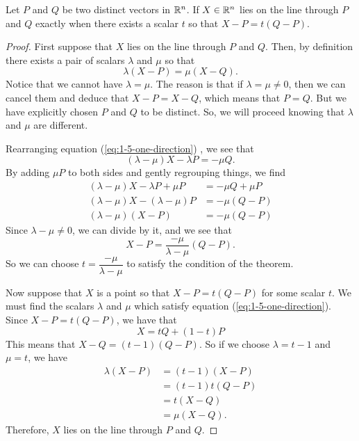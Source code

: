 \documentclass[elementsmain.tex]{subfiles}
\begin{document}
\begin{theorem} \label{thm:one-direction}
Let $P$ and $Q$ be two distinct vectors in $\mathbb{R}^n$.
If $X\in\mathbb{R}^n$ lies on the line through $P$ and $Q$ exactly when there exists a scalar $t$ so that $X-P = t(Q-P)$.
\end{theorem}

\begin{proof}
First suppose that $X$ lies on the line through $P$ and $Q$. Then, by definition there exists a pair of scalars $\lambda$ and $\mu$ so that 
\begin{equation}\label{eq:1-5-one-direction}
\lambda(X-P) = \mu(X-Q).
\end{equation}
Notice that we cannot have $\lambda=\mu$. The reason is that if $\lambda = \mu \neq 0$, then we can cancel them and deduce that $X-P = X-Q$, which means that $P=Q$. But we have explicitly chosen $P$ and $Q$ to be distinct. So, we will proceed knowing that $\lambda$ and $\mu$ are different.

Rearranging equation (\ref{eq:1-5-one-direction}) , we see that
\[
(\lambda-\mu)X - \lambda P = -\mu Q.
\]
By adding $\mu P$ to both sides and gently regrouping things, we find
\begin{align*}
(\lambda - \mu) X -\lambda P + \mu P &= - \mu Q + \mu P \\
(\lambda - \mu) X - (\lambda -\mu)P &= -\mu (Q - P) \\
(\lambda - \mu) (X - P) &= -\mu (Q - P)
\end{align*}
Since $\lambda - \mu \neq 0$, we can divide by it, and we see that
\[
X - P = \dfrac{-\mu}{\lambda-\mu} (Q-P).
\]
So we can choose $t = \dfrac{-\mu}{\lambda-\mu}$ to satisfy the condition of the theorem.

Now suppose that $X$ is a point so that $X-P = t (Q-P)$ for some scalar $t$.
We must find the scalars $\lambda$ and $\mu$ which satisfy equation (\ref{eq:1-5-one-direction}). Since $X-P = t(Q-P)$, we have that 
\begin{equation}\label{eq:symmetric-line}
X = tQ + (1-t)P
\end{equation}
This means that $X-Q = (t-1)(Q-P)$. So if we choose $\lambda = t-1$ and $\mu = t$, we have
\[
\begin{split}
\lambda (X-P) & = (t-1) (X-P) \\
		& = (t-1) t (Q-P) \\
		& = t (X-Q) \\
		& = \mu (X-Q).
\end{split}
\]
Therefore, $X$ lies on the line through $P$ and $Q$.
\end{proof}
\end{document}
